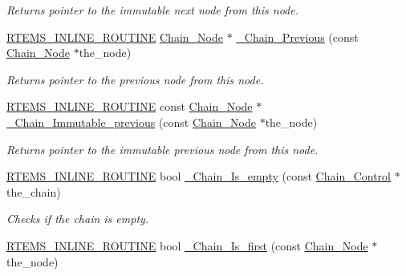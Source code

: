 \begin{DoxyCompactItemize}
\begin{DoxyCompactList}\small\item\em Returns pointer to the immutable next node from this node. \end{DoxyCompactList}\item 
\mbox{\hyperlink{group__RTEMSScoreBaseDefs_gac216239df231d5dbd15e3520b0b9313f}{R\+T\+E\+M\+S\+\_\+\+I\+N\+L\+I\+N\+E\+\_\+\+R\+O\+U\+T\+I\+NE}} \mbox{\hyperlink{group__RTEMSScoreChain_ga0dd4bfcca1ac7f90de2842e447846d3d}{Chain\+\_\+\+Node}} $\ast$ \mbox{\hyperlink{group__RTEMSScoreChain_ga78b26f26fab1b3831f449e7a94a51692}{\+\_\+\+Chain\+\_\+\+Previous}} (const \mbox{\hyperlink{group__RTEMSScoreChain_ga0dd4bfcca1ac7f90de2842e447846d3d}{Chain\+\_\+\+Node}} $\ast$the\+\_\+node)
\begin{DoxyCompactList}\small\item\em Returns pointer to the previous node from this node. \end{DoxyCompactList}\item 
\mbox{\hyperlink{group__RTEMSScoreBaseDefs_gac216239df231d5dbd15e3520b0b9313f}{R\+T\+E\+M\+S\+\_\+\+I\+N\+L\+I\+N\+E\+\_\+\+R\+O\+U\+T\+I\+NE}} const \mbox{\hyperlink{group__RTEMSScoreChain_ga0dd4bfcca1ac7f90de2842e447846d3d}{Chain\+\_\+\+Node}} $\ast$ \mbox{\hyperlink{group__RTEMSScoreChain_gaa81e1b020b85914e70cae9736bf5b3e3}{\+\_\+\+Chain\+\_\+\+Immutable\+\_\+previous}} (const \mbox{\hyperlink{group__RTEMSScoreChain_ga0dd4bfcca1ac7f90de2842e447846d3d}{Chain\+\_\+\+Node}} $\ast$the\+\_\+node)
\begin{DoxyCompactList}\small\item\em Returns pointer to the immutable previous node from this node. \end{DoxyCompactList}\item 
\mbox{\hyperlink{group__RTEMSScoreBaseDefs_gac216239df231d5dbd15e3520b0b9313f}{R\+T\+E\+M\+S\+\_\+\+I\+N\+L\+I\+N\+E\+\_\+\+R\+O\+U\+T\+I\+NE}} bool \mbox{\hyperlink{group__RTEMSScoreChain_ga67ffad0c14d402473760ec6bb8e93bcc}{\+\_\+\+Chain\+\_\+\+Is\+\_\+empty}} (const \mbox{\hyperlink{unionChain__Control}{Chain\+\_\+\+Control}} $\ast$the\+\_\+chain)
\begin{DoxyCompactList}\small\item\em Checks if the chain is empty. \end{DoxyCompactList}\item 
\mbox{\hyperlink{group__RTEMSScoreBaseDefs_gac216239df231d5dbd15e3520b0b9313f}{R\+T\+E\+M\+S\+\_\+\+I\+N\+L\+I\+N\+E\+\_\+\+R\+O\+U\+T\+I\+NE}} bool \mbox{\hyperlink{group__RTEMSScoreChain_ga47c4ae692b2752899ac0ac3515fbf985}{\+\_\+\+Chain\+\_\+\+Is\+\_\+first}} (const \mbox{\hyperlink{group__RTEMSScoreChain_ga0dd4bfcca1ac7f90de2842e447846d3d}{Chain\+\_\+\+Node}} $\ast$the\+\_\+node)

\end{DoxyCompactItemize}
